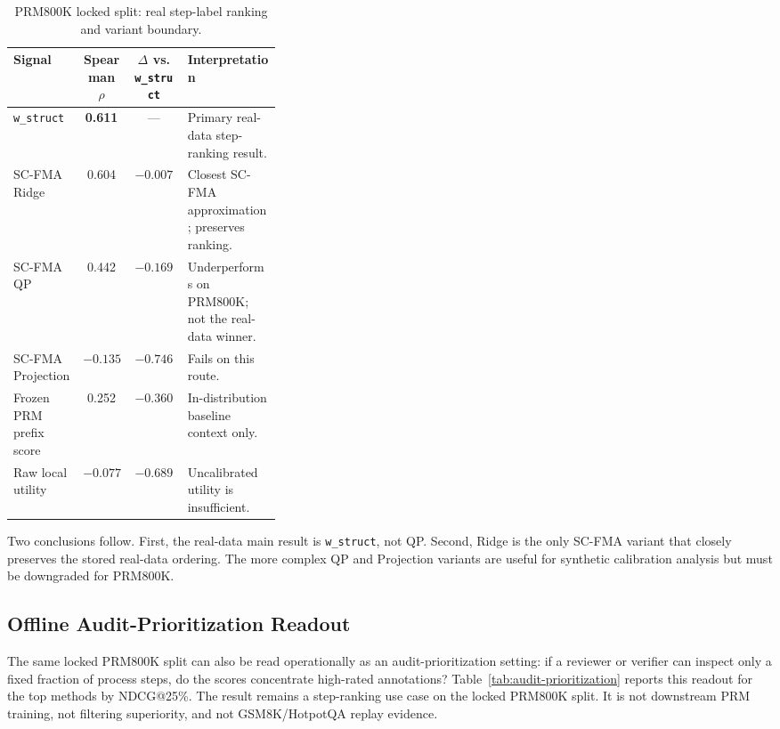 \documentclass[a4paper,fleqn]{cas-sc}
\begin{document}
\begin{table}[t]
\caption{PRM800K locked split: real step-label ranking and variant boundary.}
\label{tab:prm800k-main}
\centering
\small
\begin{tabular}{lccp{0.35\linewidth}}
\toprule
\textbf{Signal} & \textbf{Spearman $\rho$} & \textbf{$\Delta$ vs. \texttt{w\_struct}} & \textbf{Interpretation} \\
\midrule
\texttt{w\_struct} & \textbf{0.611} & --- & Primary real-data step-ranking result. \\
SC-FMA Ridge & 0.604 & $-0.007$ & Closest SC-FMA approximation; preserves ranking. \\
SC-FMA QP & 0.442 & $-0.169$ & Underperforms on PRM800K; not the real-data winner. \\
SC-FMA Projection & $-0.135$ & $-0.746$ & Fails on this route. \\
Frozen PRM prefix score & 0.252 & $-0.360$ & In-distribution baseline context only. \\
Raw local utility & $-0.077$ & $-0.689$ & Uncalibrated utility is insufficient. \\
\bottomrule
\end{tabular}
\end{table}

Two conclusions follow. First, the real-data main result is \texttt{w\_struct}, not QP. Second, Ridge is the only SC-FMA variant that closely preserves the stored real-data ordering. The more complex QP and Projection variants are useful for synthetic calibration analysis but must be downgraded for PRM800K.

\subsection{Offline Audit-Prioritization Readout}

The same locked PRM800K split can also be read operationally as an audit-prioritization setting: if a reviewer or verifier can inspect only a fixed fraction of process steps, do the scores concentrate high-rated annotations? Table~\ref{tab:audit-prioritization} reports this readout for the top methods by NDCG@25\%. The result remains a step-ranking use case on the locked PRM800K split. It is not downstream PRM training, not filtering superiority, and not GSM8K/HotpotQA replay evidence.
\end{document}
